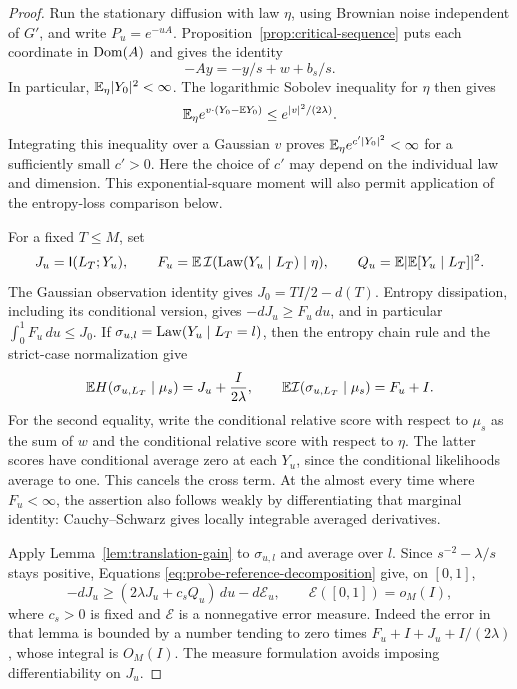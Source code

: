 \begin{proof}
Run the stationary diffusion with law $\eta$, using Brownian noise
independent of $G'$, and write $P_u=e^{-uA}$.
Proposition~\ref{prop:critical-sequence} puts each coordinate in
$\operatorname{Dom}(A)$ and gives the identity
\begin{equation}
 -Ay=-y/s+w+b_s/s.
 \label{eq:prediction-coordinate-generator}
\end{equation}
In particular, $\mathbb E_\eta|Y_0|^2<\infty$. The logarithmic Sobolev
inequality for $\eta$ then gives
\[
 \mathbb E_\eta e^{v\cdot(Y_0-\mathbb E Y_0)}
 \le e^{|v|^2/(2\lambda)}.
\]
Integrating this inequality over a Gaussian $v$ proves
$\mathbb E_\eta e^{c'|Y_0|^2}<\infty$ for a sufficiently small $c'>0$.
Here the choice of $c'$ may depend on the individual law and dimension.
This exponential-square moment will also permit application of the
entropy-loss comparison below.

For a fixed $T\le M$, set
\[
 J_u=\mathsf I(L_T;Y_u),\qquad
 F_u=\mathbb E\,\mathcal I(\operatorname{Law}(Y_u\mid L_T)\mid\eta),\qquad
 Q_u=\mathbb E|\mathbb E[Y_u\mid L_T]|^2.
\]
The Gaussian observation identity gives
$J_0=TI/2-d(T)$.  Entropy dissipation, including its conditional version,
gives $-dJ_u\ge F_u\,du$, and in particular
$\int_0^1F_u\,du\le J_0$.  If $\sigma_{u,l}=\operatorname{Law}(Y_u\mid L_T=l)$,
then the entropy chain rule and the strict-case normalization give
\begin{equation}
 \mathbb E H(\sigma_{u,L_T}\mid\mu_s)=J_u+\frac{I}{2\lambda},
 \qquad
 \mathbb E\mathcal I(\sigma_{u,L_T}\mid\mu_s)=F_u+I.
 \label{eq:probe-reference-decomposition}
\end{equation}
For the second equality, write the conditional relative score with
respect to $\mu_s$ as the sum of $w$ and the conditional relative score
with respect to $\eta$.  The latter scores have conditional average zero
at each $Y_u$, since the conditional likelihoods average to one.  This
cancels the cross term.  At the almost every time where $F_u<\infty$,
the assertion also follows weakly by differentiating that marginal
identity: Cauchy--Schwarz gives locally integrable averaged derivatives.

Apply Lemma~\ref{lem:translation-gain} to $\sigma_{u,l}$ and average
over $l$.  Since $s^{-2}-\lambda/s$ stays positive, Equations
\eqref{eq:probe-reference-decomposition} give, on $[0,1]$,
\begin{equation}
 -dJ_u\ge(2\lambda J_u+c_sQ_u)\,du-d\mathcal E_u,
 \qquad \mathcal E([0,1])=o_M(I),
 \label{eq:probe-decay}
\end{equation}
where $c_s>0$ is fixed and $\mathcal E$ is a nonnegative error measure.
Indeed the error in that lemma is bounded by a number tending to zero
times $F_u+I+J_u+I/(2\lambda)$, whose integral is $O_M(I)$.
The measure formulation avoids imposing differentiability on $J_u$.


\end{proof}

